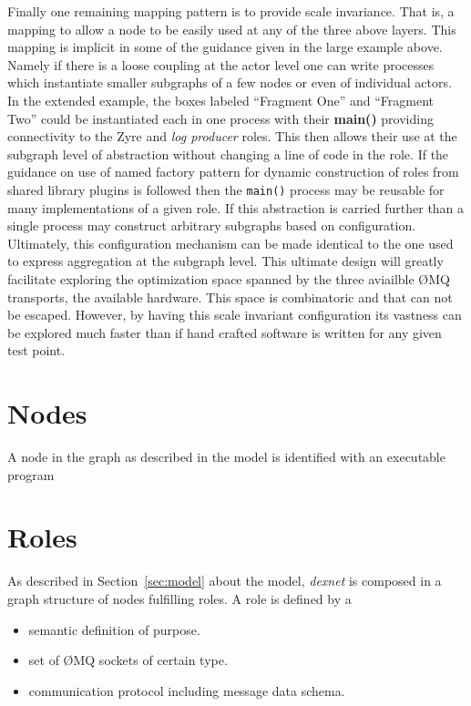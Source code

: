 \documentclass[letterpaper,oneside]{memoir}
\def\zmq{\O{}MQ\xspace}
\def\dexnet{\textit{dexnet}\xspace}
\begin{document}
Finally one remaining mapping pattern is to provide scale invariance. 
That is, a mapping to allow a node to be easily used at any of the three above layers. 
This mapping is implicit in some of the guidance given in the large example above. 
Namely if there is a loose coupling at the actor level one can write processes which instantiate smaller subgraphs of a few nodes or even of individual actors. 
In the extended example, the boxes labeled ``Fragment One'' and ``Fragment Two'' could be instantiated each in one process with their \textbf{main()} providing connectivity to the Zyre and \textit{log producer} roles. 
This then allows their use at the subgraph level of abstraction without changing a line of code in the role. 
If the guidance on use of named factory pattern for dynamic construction of roles from shared library plugins is followed then the \texttt{main()} process may be reusable for many implementations of a given role. 
If this abstraction is carried further than a single process may construct arbitrary subgraphs based on configuration.
Ultimately, this configuration mechanism can be made identical to the one used to express aggregation at the subgraph level.
This ultimate design will greatly facilitate exploring the optimization space spanned by the three aviailble \zmq transports, the available hardware. 
This space is combinatoric and that can not be escaped. 
However, by having this scale invariant configuration its vastness can be explored much faster than if hand crafted software is written for any given test point.



\section{Nodes}

A node in the graph as described in the model is identified with an executable program

\section{Roles}

As described in Section~\ref{sec:model} about the model, \dexnet is composed in a graph structure of nodes fulfilling roles. 
A role is defined by a

\begin{itemize}
\item semantic definition of purpose.
\item set of \zmq sockets of certain type.
\item communication protocol including message data schema.
\end{itemize}
\end{document}
